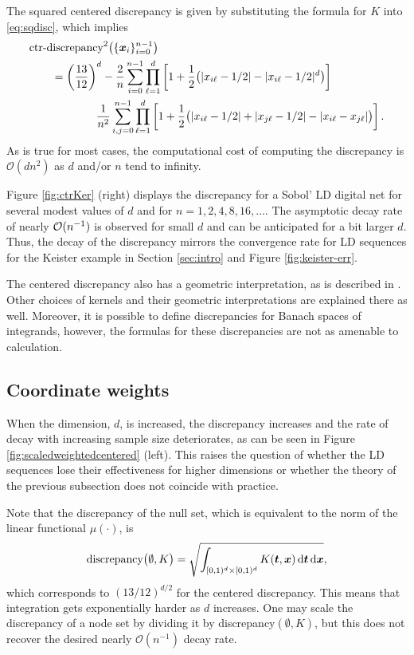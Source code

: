 \documentclass{svproc}
\begin{document}
The squared centered discrepancy is given by substituting the formula for $K$ into \eqref{eq:sqdisc}, which implies
\begin{align} \label{eq:ctrdisc}
	\nonumber
	\MoveEqLeft\text{ctr-discrepancy}^2\bigl(\{ \bsx_i\}_{i=0}^{n-1} \bigr) \\
	\nonumber
	&= \left ( \frac{13}{12} \right )^d
	- \frac 2n \sum_{i=0}^{n-1} \prod_{\ell=1}^d \left [ 1 + \frac 12 \bigl ( \lvert x_{i\ell} - 1/2 \rvert - \lvert x_{i\ell} - 1/2 \rvert^d \bigr )\right ] \\
	& \qquad \qquad \frac{1}{n^2} \sum_{i,j=0}^{n-1} \prod_{\ell = 1}^d \left[ 1 + \frac 12 \bigl ( \lvert x_{i\ell} - 1/2 \rvert + \lvert x_{j\ell} - 1/2 \rvert - \lvert x_{i\ell} - x_{j\ell} \rvert \bigr ) \right].
\end{align}
As is true for most cases, the computational cost of computing the discrepancy is $\mathcal{O}(dn^2)$ as $d$ and/or $n$ tend to infinity.

Figure  \ref{fig:ctrKer} (right)  displays the discrepancy for a Sobol' LD digital net for several modest values of $d$ and for $n =  1, 2, 4, 8, 16, \ldots$.  The asymptotic decay rate of nearly ${\mathcal{O}}(n^{-1})$ is observed for small $d$ and can be anticipated for a bit larger $d$.  Thus, the decay of the discrepancy mirrors the convergence rate for LD sequences for the Keister example in Section \ref{sec:intro} and Figure \ref{fig:keister-err}.


The centered discrepancy also has a geometric interpretation, as is described in \cite{Hic97a}. Other choices of kernels and their geometric interpretations are explained there as well.  Moreover, it is possible to define discrepancies for Banach spaces of integrands, however, the formulas for these discrepancies are not as amenable to calculation.


\subsection{Coordinate weights} \label{sec:coordwts}
When the dimension, $d$, is increased, the discrepancy increases and the rate of decay with increasing sample size deteriorates, as can be seen in Figure \ref{fig:scaledweightedcentered} (left). This raises the question of whether the LD sequences lose their effectiveness for higher dimensions or whether the theory of the previous subsection does not coincide with practice.

Note that the discrepancy of the null set, which is equivalent to the norm of the linear functional $\mu(\cdot)$, is
\begin{equation}
		\text{discrepancy}\bigl(\emptyset,K \bigr)  = \sqrt{\int_{[0,1)^d \times [0,1)^d} K({\boldsymbol{t}},{\boldsymbol{x}}) \, \mathrm{d} {\boldsymbol{t}} \, \mathrm{d} {\boldsymbol{x}}},
\end{equation}
which corresponds to $(13/12)^{d/2}$ for the centered discrepancy.  This means that integration gets exponentially harder as $d$ increases.  One may scale the discrepancy of a node set by dividing it by discrepancy$(\emptyset,K)$, but this does not recover the desired nearly $\mathcal{O}(n^{-1})$ decay rate.
\end{document}
